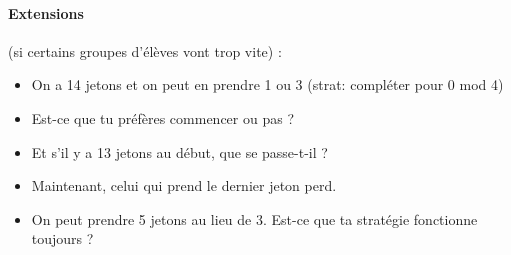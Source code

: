 \documentclass[12pt, a4paper]{article}
\begin{document}
	\paragraph*{Extensions} (si certains groupes d'élèves vont trop vite) :
	\begin{itemize}
        \item On a 14 jetons et on peut en prendre 1 ou 3 (strat: compléter pour 0 mod 4)
		\item Est-ce que tu préfères commencer ou pas ?
		\item Et s'il y a 13 jetons au début, que se passe-t-il ?
		\item Maintenant, celui qui prend le dernier jeton perd.
		\item On peut prendre 5 jetons au lieu de 3. Est-ce que ta stratégie fonctionne toujours ?
	\end{itemize}
\end{document}
